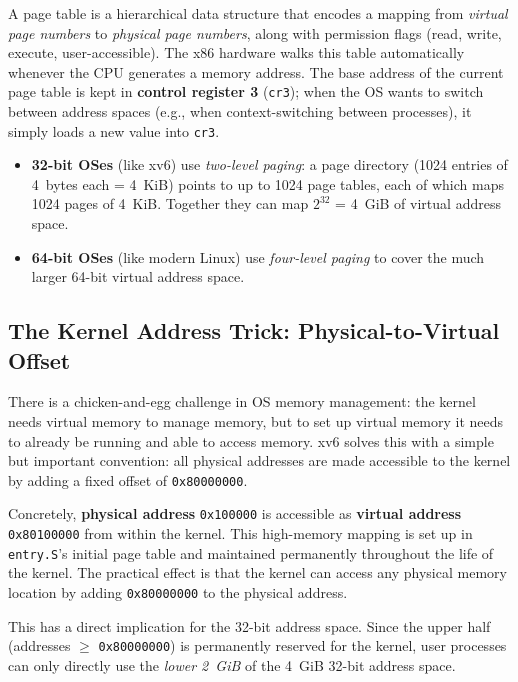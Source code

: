 \documentclass[11pt]{article}
\begin{document}
A page table is a hierarchical data structure that encodes a mapping from \emph{virtual page numbers} to \emph{physical page numbers}, along with permission flags (read, write, execute, user-accessible). The x86 hardware walks this table automatically whenever the CPU generates a memory address. The base address of the current page table is kept in \textbf{control register 3} (\texttt{cr3}); when the OS wants to switch between address spaces (e.g., when context-switching between processes), it simply loads a new value into \texttt{cr3}.

\begin{itemize}
    \item \textbf{32-bit OSes} (like xv6) use \emph{two-level paging}: a page directory (1024 entries of 4~bytes each = 4~KiB) points to up to 1024 page tables, each of which maps 1024 pages of 4~KiB. Together they can map $2^{32}$ = 4~GiB of virtual address space.
    \item \textbf{64-bit OSes} (like modern Linux) use \emph{four-level paging} to cover the much larger 64-bit virtual address space.
\end{itemize}

\subsection{The Kernel Address Trick: Physical-to-Virtual Offset}

There is a chicken-and-egg challenge in OS memory management: the kernel needs virtual memory to manage memory, but to set up virtual memory it needs to already be running and able to access memory. xv6 solves this with a simple but important convention: all physical addresses are made accessible to the kernel by adding a fixed offset of \texttt{0x80000000}.

Concretely, \textbf{physical address} \texttt{0x100000} is accessible as \textbf{virtual address} \texttt{0x80100000} from within the kernel. This high-memory mapping is set up in \texttt{entry.S}'s initial page table and maintained permanently throughout the life of the kernel. The practical effect is that the kernel can access any physical memory location by adding \texttt{0x80000000} to the physical address.

This has a direct implication for the 32-bit address space. Since the upper half (addresses $\geq$ \texttt{0x80000000}) is permanently reserved for the kernel, user processes can only directly use the \emph{lower 2~GiB} of the 4~GiB 32-bit address space.
\end{document}
